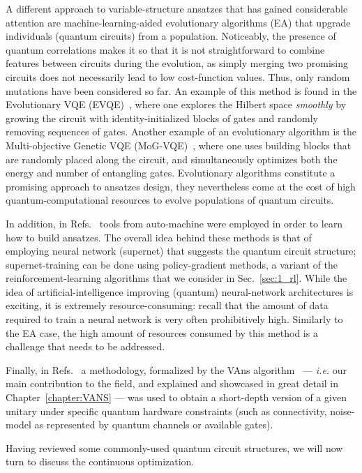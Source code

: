 A different approach to variable-structure ansatzes that has gained considerable attention are machine-learning-aided evolutionary algorithms (EA) that upgrade individuals (quantum circuits) from a population. Noticeably, the presence of quantum correlations makes it so that it is not straightforward to combine features between circuits during the evolution, as simply merging two promising circuits does not necessarily lead to low cost-function values. Thus, only random mutations have been considered so far. An example of this method is found in the
Evolutionary VQE (EVQE)~\cite{rattew2019domain}, where one explores the Hilbert space \textit{smoothly} by growing the circuit with identity-initialized blocks of gates and randomly removing sequences of gates. Another example of an evolutionary algorithm is the Multi-objective Genetic VQE (MoG-VQE)~\cite{chivilikhin2020mog}, where one uses building blocks that are randomly placed along the circuit, and simultaneously optimizes both the energy and number of entangling gates. Evolutionary algorithms constitute a promising approach to ansatzes design, they nevertheless come at the cost of high quantum-computational resources to evolve populations of quantum circuits.

In addition, in Refs.~\cite{du2020quantum,zhang2020differentiable,pirhooshyaran2021quantum,du2020quantum} tools from auto-machine were employed in order to learn how to build ansatzes. The overall idea behind these methods is that of employing neural network (supernet) that suggests the quantum circuit structure; supernet-training can be done using policy-gradient methods, a variant of the reinforcement-learning algorithms that we consider in Sec.~\ref{sec:1_rl}. While the idea of artificial-intelligence improving (quantum) neural-network architectures is exciting, it is extremely resource-consuming: recall that the amount of data required to train a neural network is very often prohibitively high. Similarly to the EA case, the high amount of resources consumed by this method is a challenge that needs to be addressed.

Finally, in Refs.~\cite{cincio2018learning,cincio2021machine} a methodology, formalized by the VAns algorithm~\cite{bilkis2021semi} --- \textit{i.e.} our main contribution to the field, and explained and showcased in great detail in Chapter~\ref{chapter:VANS} --- was used to obtain a short-depth version of a given unitary under specific quantum hardware constraints (such as connectivity, noise-model as represented by quantum channels or available gates). %

Having reviewed some commonly-used quantum circuit structures, we will now turn to discuss the continuous optimization.
